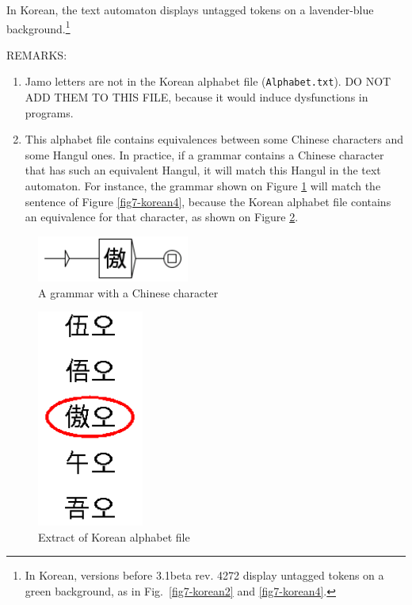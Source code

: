 \bigskip
\noindent In Korean, the text automaton displays untagged tokens on a lavender-blue
background.\footnote{In Korean, versions before 3.1beta rev. 4272 display untagged tokens
on a  green background, as in Fig.~\ref{fig7-korean2} and \ref{fig7-korean4}.}

\bigskip
\noindent REMARKS: 
\begin{enumerate}
    \item Jamo letters are not in the Korean alphabet file
    (\verb+Alphabet.txt+). DO NOT ADD THEM TO THIS FILE, because it
    would induce dysfunctions in programs.
    
    \item This alphabet file contains equivalences between some Chinese
    characters and some Hangul ones. In practice, if a grammar contains a
    Chinese character that has such an equivalent Hangul, it will match this
    Hangul in the text automaton. For instance, the grammar shown on Figure
    \ref{fig7-korean5} will match the sentence of Figure \ref{fig7-korean4},
    because the Korean alphabet file contains an equivalence for that
    character, as shown on Figure \ref{fig7-korean6}.
\end{enumerate}

\begin{figure}[!ht]
\begin{center}
\includegraphics[width=5cm]{resources/img/fig7-korean5.png}
\caption{A grammar with a Chinese character\label{fig7-korean5}}
\end{center}
\end{figure}

\begin{figure}[!ht]
\begin{center}
\includegraphics[width=3.5cm]{resources/img/fig7-korean6.png}
\caption{Extract of Korean alphabet file\label{fig7-korean6}}
\end{center}
\end{figure}